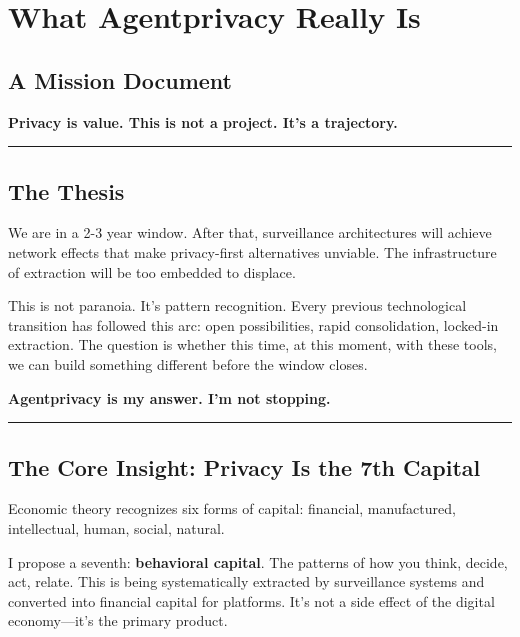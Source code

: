 \documentclass[
]{article}
\author{}
\date{}
\begin{document}
\section{What Agentprivacy Really Is}\label{what-agentprivacy-really-is}

\subsection{A Mission Document}\label{a-mission-document}

\textbf{Privacy is value. This is not a project. It's a trajectory.}

\begin{center}\rule{0.5\linewidth}{0.5pt}\end{center}

\subsection{The Thesis}\label{the-thesis}

We are in a 2-3 year window. After that, surveillance architectures will
achieve network effects that make privacy-first alternatives unviable.
The infrastructure of extraction will be too embedded to displace.

This is not paranoia. It's pattern recognition. Every previous
technological transition has followed this arc: open possibilities,
rapid consolidation, locked-in extraction. The question is whether this
time, at this moment, with these tools, we can build something different
before the window closes.

\textbf{Agentprivacy is my answer. I'm not stopping.}

\begin{center}\rule{0.5\linewidth}{0.5pt}\end{center}

\subsection{The Core Insight: Privacy Is the 7th
Capital}\label{the-core-insight-privacy-is-the-7th-capital}

Economic theory recognizes six forms of capital: financial,
manufactured, intellectual, human, social, natural.

I propose a seventh: \textbf{behavioral capital}. The patterns of how
you think, decide, act, relate. This is being systematically extracted
by surveillance systems and converted into financial capital for
platforms. It's not a side effect of the digital economy---it's the
primary product.
\end{document}
